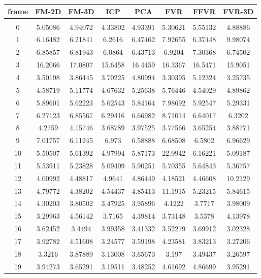 \begin{center}
\begin{longtable}{cccccccc}
\hline
\textbf{frame} & \textbf{FM-2D} & \textbf{FM-3D} & \textbf{ICP} & \textbf{PCA} & \textbf{FVR} & \textbf{FFVR} & \textbf{FVR-3D} \\
\hline \\
0 & 5.05086 & 4.94072 & 4.33802 & 4.93391 & 5.30621 & 5.55132 & 4.88886\\
1 & 6.16482 & 6.21841 & 6.2616 & 6.47462 & 7.92655 & 6.37448 & 9.98074\\
2 & 6.85857 & 6.81943 & 6.0864 & 6.43713 & 6.9204 & 7.30368 & 6.74502\\
3 & 16.2066 & 17.0807 & 15.6458 & 16.4459 & 16.3367 & 16.5471 & 15.9051\\
4 & 3.50198 & 3.86445 & 3.70225 & 4.80994 & 3.30395 & 5.12324 & 3.25735\\
5 & 4.58719 & 5.11774 & 4.67632 & 5.25638 & 5.76446 & 4.54029 & 4.89862\\
6 & 5.89601 & 5.62223 & 5.62543 & 5.84164 & 7.98692 & 5.92547 & 5.29331\\
7 & 6.27123 & 6.85567 & 6.29416 & 6.66982 & 8.71014 & 6.64017 & 6.3202\\
8 & 4.2759 & 4.15746 & 3.68789 & 3.97525 & 3.77566 & 3.65254 & 3.88771\\
9 & 7.01757 & 6.11245 & 6.973 & 6.58888 & 6.68508 & 6.5802 & 6.96629\\
10 & 5.50507 & 5.61392 & 4.97994 & 5.87173 & 22.9942 & 6.16221 & 5.09187\\
11 & 5.53911 & 5.23828 & 5.09409 & 5.90251 & 5.70355 & 5.64843 & 5.36757\\
12 & 4.00992 & 4.48817 & 4.9641 & 4.86449 & 4.18521 & 4.46608 & 10.2129\\
13 & 4.79772 & 4.38202 & 4.54437 & 4.85413 & 11.1915 & 5.23215 & 5.84615\\
14 & 4.30203 & 3.80502 & 3.47925 & 3.95896 & 4.1222 & 3.7717 & 3.98009\\
15 & 3.29963 & 4.56142 & 3.7165 & 4.39814 & 3.73148 & 3.5378 & 4.13978\\
16 & 3.62452 & 3.4494 & 3.99358 & 3.41332 & 3.52279 & 3.69912 & 3.02328\\
17 & 3.92782 & 4.51608 & 3.24577 & 3.59198 & 4.23581 & 3.83213 & 3.27206\\
18 & 3.3216 & 3.87889 & 3.13008 & 3.65673 & 3.197 & 3.49437 & 3.26597\\
19 & 3.94273 & 3.65291 & 3.19511 & 3.48252 & 4.61692 & 4.86699 & 3.95291\\

\end{longtable}
\end{center}

